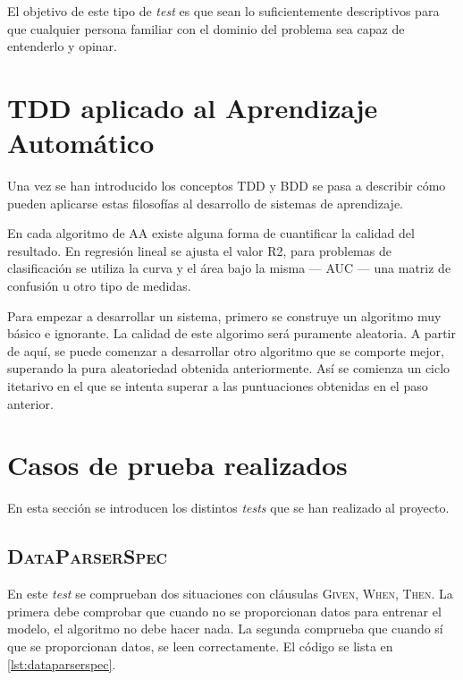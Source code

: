 El objetivo de este tipo de \emph{test} es que sean lo suficientemente
descriptivos para que cualquier persona familiar con el dominio del problema sea
capaz de entenderlo y opinar.

\section{TDD aplicado al Aprendizaje Automático}
\label{sec:tddml}

Una vez se han introducido los conceptos \ac{TDD} y \ac{BDD} se pasa a describir
cómo pueden aplicarse estas filosofías al desarrollo de sistemas de
aprendizaje.

En cada algoritmo de \ac{AA} existe alguna forma de cuantificar la calidad del
resultado. En regresión lineal se ajusta el valor R2, para problemas de
clasificación se utiliza la curva  y el área bajo la misma ---
\ac{AUC} --- una matriz de confusión u otro tipo de medidas.

Para empezar a desarrollar un sistema, primero se construye un algoritmo muy
básico e ignorante. La calidad de este algorimo será puramente aleatoria. A
partir de aquí, se puede comenzar a desarrollar otro algoritmo que se comporte
mejor, superando la pura aleatoriedad obtenida anteriormente. Así se comienza un
ciclo itetarivo en el que se intenta superar a las puntuaciones obtenidas en el
paso anterior.

\section{Casos de prueba realizados}
\label{sec:impltests}

En esta sección se introducen los distintos \emph{tests} que se han realizado al
proyecto.

\subsection{\textsc{DataParserSpec}}
\label{sec:dataparser}

En este \emph{test} se comprueban dos situaciones con cláusulas \textsc{Given,
  When, Then}. La primera debe comprobar que cuando no se proporcionan datos
para entrenar el modelo, el algoritmo no debe hacer nada. La segunda comprueba
que cuando sí que se proporcionan datos, se leen correctamente. El código se
lista en \autoref{lst:dataparserspec}.

